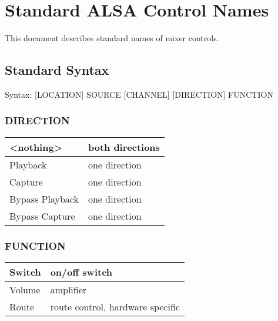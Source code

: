 \documentclass[a4paper,8pt,english]{sphinxmanual}
\begin{document}
\section{Standard ALSA Control Names}
\label{sound/designs/control-names::doc}\label{sound/designs/control-names:standard-alsa-control-names}
This document describes standard names of mixer controls.


\subsection{Standard Syntax}
\label{sound/designs/control-names:standard-syntax}
Syntax: {[}LOCATION{]} SOURCE {[}CHANNEL{]} {[}DIRECTION{]} FUNCTION


\subsubsection{DIRECTION}
\label{sound/designs/control-names:direction}
\begin{tabulary}{\linewidth}{|L|L|}
\hline

\textless{}nothing\textgreater{}
 & 
both directions
\\
\hline
Playback
 & 
one direction
\\
\hline
Capture
 & 
one direction
\\
\hline
Bypass Playback
 & 
one direction
\\
\hline
Bypass Capture
 & 
one direction
\\
\hline\end{tabulary}



\subsubsection{FUNCTION}
\label{sound/designs/control-names:function}
\begin{tabulary}{\linewidth}{|L|L|}
\hline

Switch
 & 
on/off switch
\\
\hline
Volume
 & 
amplifier
\\
\hline
Route
 & 
route control, hardware specific
\\
\hline\end{tabulary}
\end{document}
